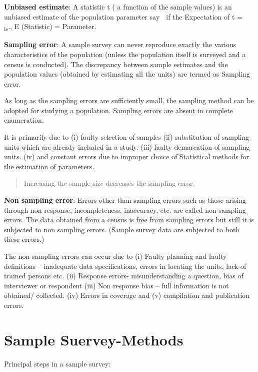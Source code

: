 \documentclass[
]{book}
\begin{document}
\textbf{Unbiased estimate}: A statistic t ( a function of the sample values) is an unbiased estimate of the population parameter say  if the Expectation of t =  \textsubscript{ie}., E (Statistic) = Parameter.

\textbf{Sampling error}: A sample survey can never reproduce exactly the various characteristics of the population (unless the population itself is surveyed and a census is conducted). The discrepancy between sample estimates and the population values (obtained by estimating all the units) are termed as Sampling error.

As long as the sampling errors are sufficiently small, the sampling method can be adopted for studying a population. Sampling errors are absent in complete enumeration.

It is primarily due to (i) faulty selection of samples (ii) substitution of sampling units which are already included in a study. (iii) faulty demarcation of sampling units. (iv) and constant errors due to improper choice of Statistical methods for the estimation of parameters.

\begin{quote}
Increasing the sample size decreases the sampling error.
\end{quote}

\textbf{Non sampling error}: Errors other than sampling errors such as those arising through non response, incompleteness, inaccuracy, etc. are called non sampling errors. The data obtained from a census is free from sampling errors but still it is subjected to non sampling errors. (Sample survey data are subjected to both these errors.)

The non sampling errors can occur due to (i) Faulty planning and faulty definitions -- inadequate data specifications, errors in locating the units, lack of trained persons etc. (ii) Response errors- misunderstanding a question, bias of interviewer or respondent (iii) Non response bias -- full information is not obtained/ collected. (iv) Errors in coverage and (v) compilation and publication errors.

\hypertarget{sample-suervey-methods}{%
\section{Sample Suervey-Methods}\label{sample-suervey-methods}}

Principal steps in a sample survey:
\end{document}

